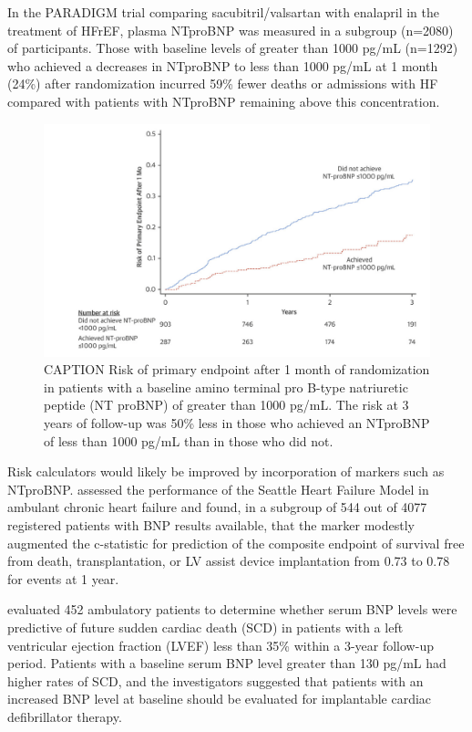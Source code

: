 \documentclass[14pt,a4paper,onecolumn]{extarticle}
\begin{document}
In the PARADIGM trial comparing sacubitril/valsartan with enalapril in the treatment of HFrEF, plasma NTproBNP was measured in a subgroup (n=2080) of participants.  Those with baseline levels of greater than 1000 pg/mL (n=1292) who achieved a decreases in NTproBNP to less than 1000 pg/mL at 1 month (24\%) after randomization incurred 59\% fewer deaths or admissions with HF compared with patients with NTproBNP remaining above this concentration. \citep{Zile2016}

\begin{figure}   \includegraphics{../../images/NTBNP_zile.png}   \caption{CAPTION Risk of primary endpoint after 1 month of randomization in patients with a baseline amino terminal pro B-type natriuretic peptide (NT proBNP) of greater than 1000 pg/mL. The risk at 3 years of follow-up was 50\% less in those who achieved an NTproBNP of less than 1000 pg/mL than in those who did not. \citep{Zile2016}}   \label{NTBNP_zile} \end{figure}

Risk calculators would likely be improved by incorporation of markers such as NTproBNP. \citep{May2007} assessed the performance of the Seattle Heart Failure Model in ambulant chronic heart failure and found, in a subgroup of 544 out of 4077 registered patients with BNP results available, that the marker modestly augmented the c-statistic for prediction of the composite endpoint of survival free from death, transplantation, or LV assist device implantation from 0.73 to 0.78 for events at 1 year. \citep{May2007}

\citep{Berger2002}  evaluated 452 ambulatory patients to determine whether serum BNP levels were predictive of future sudden cardiac death (SCD) in patients with a left ventricular ejection fraction (LVEF) less than 35\% within a 3-year follow-up period. Patients with a baseline serum BNP level greater than 130 pg/mL had higher rates of SCD, and the investigators suggested that patients with an increased BNP level at baseline should be evaluated for implantable cardiac defibrillator therapy. \citep{Berger2002} %
\end{document}
